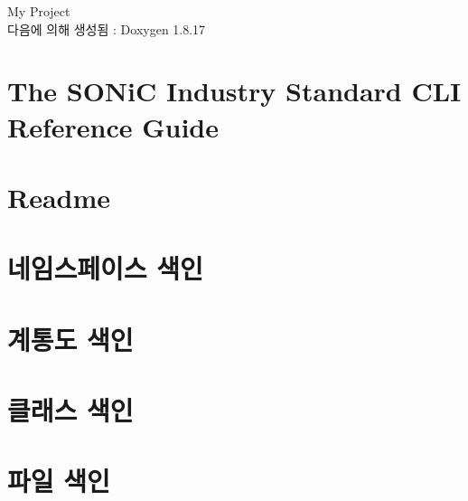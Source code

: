 \let\mypdfximage\pdfximage\def\pdfximage{\immediate\mypdfximage}\documentclass[twoside]{book}
\newcommand{\+}{\discretionary{\mbox{\scriptsize$\hookleftarrow$}}{}{}}
\newcommand{\clearemptydoublepage}{%
  \newpage{\pagestyle{empty}\cleardoublepage}%
}
\begin{document}
\hypersetup{pageanchor=false,
             bookmarksnumbered=true,
             pdfencoding=unicode
            }
\begin{titlepage}
\vspace*{7cm}
\begin{center}%
{\Large My Project }\\
\vspace*{1cm}
{\large 다음에 의해 생성됨 \+:  Doxygen 1.8.17}\\
\end{center}
\end{titlepage}
\clearemptydoublepage
{}
\tableofcontents
\clearemptydoublepage
{}
\hypersetup{pageanchor=true}

\chapter{The S\+O\+NiC Industry Standard C\+LI Reference Guide}
\label{md_cli_command-tree_industry_standard_cli_reference_guide}

\chapter{Readme}
\label{md_Readme}

\chapter{네임스페이스 색인}

\chapter{계통도 색인}

\chapter{클래스 색인}

\chapter{파일 색인}

\end{document}
